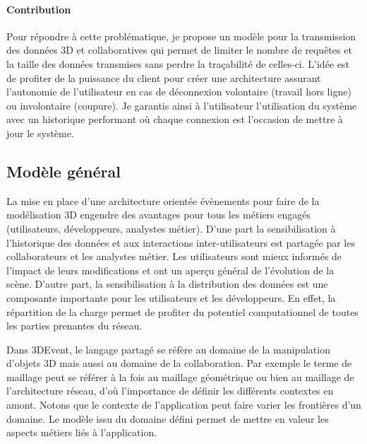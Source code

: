 \paragraph{Contribution}
Pour répondre à cette problématique, je propose un modèle pour la 
transmission des données 3D et collaboratives qui permet de  limiter  le nombre 
de requêtes et la taille des données transmises sans perdre la traçabilité de 
celles-ci. L'idée est de profiter de la puissance du client pour créer une 
architecture assurant l'autonomie de l'utilisateur en cas de déconnexion volontaire 
(travail hors ligne) ou involontaire (coupure). Je garantis ainsi à l'utilisateur 
l'utilisation du système avec un historique performant où chaque connexion est 
l'occasion de mettre à jour le système.


\subsection{Modèle général}
La mise en place d'une architecture orientée évènements pour faire de la modélisation 3D engendre des avantages pour tous les métiers engagés (utilisateurs, développeurs, analystes 
métier).
D'une part la sensibilisation à l'historique des 
données et aux interactions 
inter-utilisateurs est partagée par les collaborateurs et les analystes métier. Les utilisateurs sont mieux informés de l'impact de leurs modifications et ont un aperçu général de l'évolution de la scène. D'autre part, 
la sensibilisation à la distribution des données est une composante 
importante pour les utilisateurs et les développeurs. En effet, la répartition 
de la charge permet de profiter du potentiel computationnel de toutes les parties 
prenantes du réseau. 

Dans 3DEvent, le langage partagé se réfère au domaine de la manipulation 
d'objets 3D mais aussi au domaine de la collaboration. Par exemple le terme de 
maillage peut se référer à la fois au maillage géométrique ou bien au maillage de 
l'architecture réseau, d'où l'importance de définir les différents contextes en amont. 
Notons que le contexte de l'application peut faire varier les frontières d'un 
domaine. Le modèle issu du domaine défini permet de mettre en valeur les 
aspects métiers liés à l'application.

